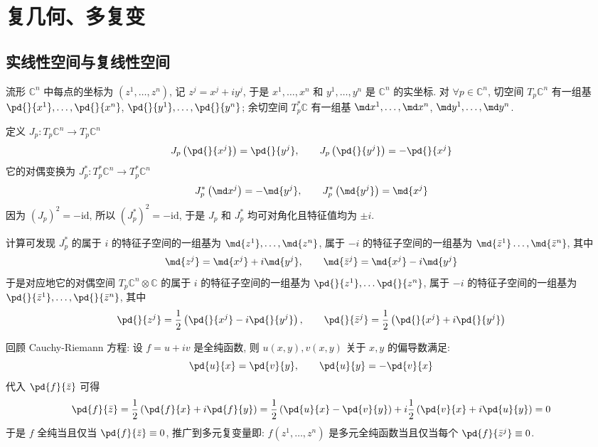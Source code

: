 \chapter{复几何、多复变}
    \section{实线性空间与复线性空间}
        流形 $\mathbb{C}^n$ 中每点的坐标为 $(z^1,\dots,z^n)$, 记 $z^j=x^j+iy^j$, 于是 $x^1,\dots,x^n$ 和 $y^1,\dots,y^n$ 是 $\mathbb{C}^n$ 的实坐标.
        对 $\forall p\in\mathbb{C}^n$, 切空间 $T_p\mathbb{C}^n$ 有一组基 $\pd{}{x^1},\dots,\pd{}{x^n}$, $\pd{}{y^1},\dots,\pd{}{y^n}$; 余切空间 $T^*_p\mathbb{C}$
        有一组基 $\md x^1,\dots,\md x^n$, $\md y^1,\dots,\md y^n$.

        定义 $J_p:T_p\mathbb{C}^n\rightarrow T_p\mathbb{C}^n$
        \begin{equation*}
            J_p\left(\pd{}{x^j}\right)=\pd{}{y^j},\qquad J_p\left(\pd{}{y^j}\right)=-\pd{}{x^j}
        \end{equation*}
        它的对偶变换为 $J^*_p:T^*_p\mathbb{C}^n\rightarrow T^*_p\mathbb{C}^n$
        \begin{equation*}
            J^*_p\left(\md x^j\right)=-\md{y^j},\qquad J^*_p\left(\md{y^j}\right)=\md{x^j}
        \end{equation*}
        因为 $(J_p)^2=-\mathrm{id}$, 所以 $(J^*_p)^2=-\mathrm{id}$, 于是 $J_p$ 和 $J^*_p$ 均可对角化且特征值均为 $\pm i$.

        计算可发现 $J^*_p$ 的属于 $i$ 的特征子空间的一组基为 $\md{z^1},\dots,\md{z^n}$, 属于 $-i$ 的特征子空间的一组基为 $\md{\bar{z}^1}\dots,\md{\bar{z}^n}$, 其中
        \begin{equation*}
            \md{z^j}=\md{x^j}+i\md{y^j},\qquad \md{\bar{z}^j}=\md{x^j}-i\md{y^j}
        \end{equation*}
        于是对应地它的对偶空间 $T_p\mathbb{C}^n\otimes\mathbb{C}$ 的属于 $i$ 的特征子空间的一组基为 $\pd{}{z^1},\dots\pd{}{z^n}$, 属于 $-i$ 的特征子空间的一组基为 $\pd{}{\bar{z}^1},\dots,\pd{}{\bar{z}^n}$, 其中
        \begin{equation}\label{partialz&partialbarz}
            \pd{}{z^j}=\frac{1}{2}\left(\pd{}{x^j}-i\pd{}{y^j}\right),\qquad \pd{}{\bar{z}^j}=\frac{1}{2}\left(\pd{}{x^j}+i\pd{}{y^j}\right)
        \end{equation}
        
        回顾 Cauchy-Riemann 方程: 设 $f=u+iv$ 是全纯函数, 则 $u(x,y),v(x,y)$ 关于 $x,y$ 的偏导数满足:
        \begin{equation*}
            \pd{u}{x}=\pd{v}{y},\qquad \pd{u}{y}=-\pd{v}{x}
        \end{equation*}
        代入 $\pd{f}{\bar{z}}$ 可得
        \begin{equation*}
            \pd{f}{\bar{z}}=\frac{1}{2}\left(\pd{f}{x}+i\pd{f}{y}\right)=\frac{1}{2}\left(\pd{u}{x}-\pd{v}{y}\right)+i\frac{1}{2}\left(\pd{v}{x}+i\pd{u}{y}\right)=0
        \end{equation*}
        于是 $f$ 全纯当且仅当 $\pd{f}{\bar{z}}\equiv0$, 推广到多元复变量即: $f(z^1,\dots,z^n)$ 是多元全纯函数当且仅当每个 $\pd{f}{\bar{z}^j}\equiv0$.
    
